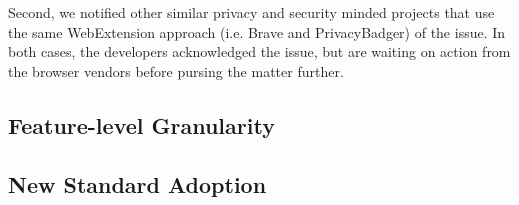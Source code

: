 Second, we notified other similar privacy and security minded
projects that use the same WebExtension approach (i.e. Brave and PrivacyBadger)
of the issue.  In both cases, the developers acknowledged the issue, but are
waiting on action from the browser vendors before pursing the matter further.




\subsection{Feature-level Granularity}
\subsection{New Standard Adoption}